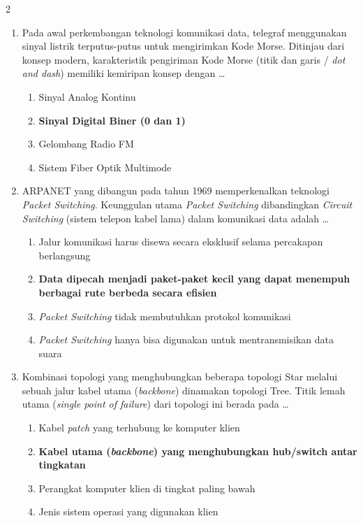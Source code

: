 \documentclass[10pt,a4paper]{article}
\begin{document}
\begin{multicols}{2}
\begin{enumerate}
    \item Pada awal perkembangan teknologi komunikasi data, telegraf menggunakan sinyal listrik terputus-putus untuk mengirimkan Kode Morse. Ditinjau dari konsep modern, karakteristik pengiriman Kode Morse (titik dan garis / \emph{dot and dash}) memiliki kemiripan konsep dengan \dots
    \begin{enumerate}
        \item Sinyal Analog Kontinu
        \item \textbf{Sinyal Digital Biner (0 dan 1)}
        \item Gelombang Radio FM
        \item Sistem Fiber Optik Multimode
    \end{enumerate}

    \item ARPANET yang dibangun pada tahun 1969 memperkenalkan teknologi \emph{Packet Switching}. Keunggulan utama \emph{Packet Switching} dibandingkan \emph{Circuit Switching} (sistem telepon kabel lama) dalam komunikasi data adalah \dots
    \begin{enumerate}
        \item Jalur komunikasi harus disewa secara eksklusif selama percakapan berlangsung
        \item \textbf{Data dipecah menjadi paket-paket kecil yang dapat menempuh berbagai rute berbeda secara efisien}
        \item \emph{Packet Switching} tidak membutuhkan protokol komunikasi
        \item \emph{Packet Switching} hanya bisa digunakan untuk mentransmisikan data suara
    \end{enumerate}

    \item Kombinasi topologi yang menghubungkan beberapa topologi Star melalui sebuah jalur kabel utama (\emph{backbone}) dinamakan topologi Tree. Titik lemah utama (\emph{single point of failure}) dari topologi ini berada pada \dots
    \begin{enumerate}
        \item Kabel \emph{patch} yang terhubung ke komputer klien
        \item \textbf{Kabel utama (\emph{backbone}) yang menghubungkan hub/switch antar tingkatan}
        \item Perangkat komputer klien di tingkat paling bawah
        \item Jenis sistem operasi yang digunakan klien
    \end{enumerate}


\end{enumerate}
\end{multicols}
\end{document}

